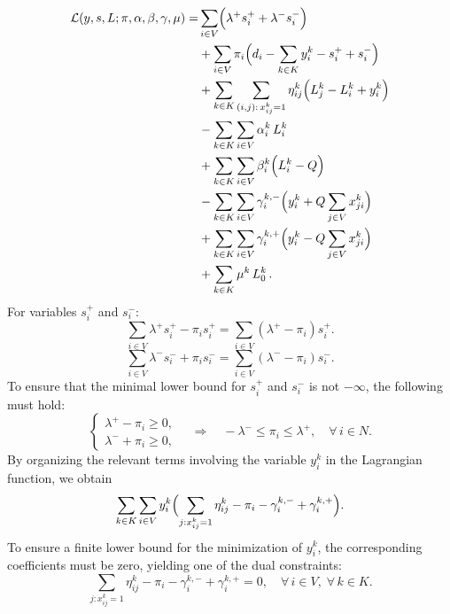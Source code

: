 \documentclass[preprint,12pt,authoryear]{elsarticle}
\begin{document}
\begin{equation*}
\begin{aligned}
\mathcal{L}(y,s,L;\pi,\alpha,\beta,\gamma,\mu) =  &\sum_{i\in V} \Bigl( \lambda^+ s_i^+ + \lambda^- s_i^- \Bigr) \\
& +\sum_{i\in V} \pi_i \Bigl( d_i - \sum_{k\in K} y_i^k - s_i^+ + s_i^- \Bigr)\\
& + \sum_{k\in K}\sum_{(i,j):\, x_{ij}^k=1} \eta_{ij}^k \Bigl( L_j^k - L_i^k + y_i^k \Bigr) \\
& - \sum_{k\in K}\sum_{i\in V} \alpha_i^k \, L_i^k \\
& + \sum_{k\in K}\sum_{i\in V} \beta_i^k \Bigl( L_i^k - Q \Bigr) \\
& - \sum_{k\in K}\sum_{i\in V} \gamma_i^{k,-} \Bigl( y_i^k + Q\sum_{j\in V} x_{ji}^k \Bigr) \\
& + \sum_{k\in K}\sum_{i\in V} \gamma_i^{k,+} \Bigl( y_i^k - Q\sum_{j\in V} x_{ji}^k \Bigr) \\
& + \sum_{k\in K} \mu^k\, L_0^k \,.
\end{aligned}
\end{equation*}
For variables \( s_i^+ \) and \( s_i^- \):
\begin{equation*}
\sum_{i\in V}\lambda^+ s_i^+ - \pi_i s_i^+ = \sum_{i\in V}(\lambda^+ - \pi_i) s_i^+.
\end{equation*}
\begin{equation*}
\sum_{i\in V}\lambda^- s_i^- + \pi_i s_i^- = \sum_{i\in V}(\lambda^- - \pi_i) s_i^-.
\end{equation*}
To ensure that the minimal lower bound for  $s_i^+$ and $s_i^-$ is not $-\infty$, the following must hold:
\begin{equation*}
    \begin{cases}
    \lambda^+ - \pi_i \geq 0 , \\
    \lambda^- + \pi_i \geq 0 ,
\end{cases} \quad \Rightarrow \quad -\lambda^- \leq \pi_i \leq \lambda^+, \quad \forall\, i \in N.
\end{equation*}
By organizing the relevant terms involving the variable $y_i^k$ in the Lagrangian function, we obtain
\begin{equation*}
\sum_{k\in K}\sum_{i\in V}y_i^k \Bigl( \sum_{j: x_{ij}^k=1} \eta_{ij}^k - \pi_i - \gamma_i^{k,-} + \gamma_i^{k,+} \Bigr).
\end{equation*}
To ensure a finite lower bound for the minimization of \( y_i^k \), the corresponding coefficients must be zero, yielding one of the dual constraints:
\begin{equation*}
\sum_{j: x_{ij}^k=1} \eta_{ij}^k - \pi_i - \gamma_i^{k,-} + \gamma_i^{k,+} = 0,\quad \forall\, i\in V,\; \forall\, k\in K.
\end{equation*}
\end{document}

